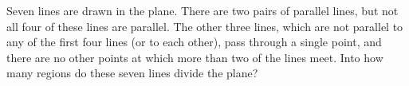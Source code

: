 Seven lines are drawn in the plane. There are two pairs of parallel lines, but not all four of these lines are parallel. The other three lines, which are not parallel to any of the first four lines (or to each other), pass through a single point, and there are no other points at which more than two of the lines meet. Into how many regions do these seven lines divide the plane?
